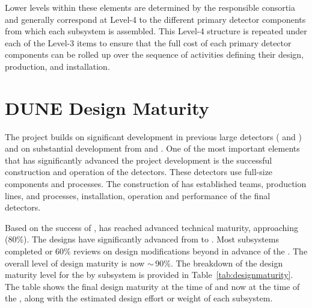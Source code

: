 Lower levels within these  elements are determined by 
the responsible consortia and generally correspond at Level-4 to 
the different primary detector components from which each subsystem
is assembled.  This Level-4 structure is repeated under each of the 
Level-3 items to ensure that the full cost of each primary detector 
components can be rolled up over the sequence of activities defining 
their design, production, and installation.       

\section{DUNE Design Maturity}

The  project builds on significant development in previous
large  detectors ( and ) and on
substantial development from  and . One of the most important
elements that has significantly advanced the project development is
the successful construction and operation of the 
detectors. These detectors use full-size  components and
processes. The construction of  has established
teams, production lines,  and  processes, installation, operation
and performance of the final  detectors. 

Based on the
success of ,  has reached advanced technical
maturity, approaching (80\%). The designs have significantly advanced
from  to . Most subsystems completed
 or 60\% reviews on design modifications beyond
 in advance of the . The overall level of
design maturity is now $\sim\,$90\%. The breakdown of the design maturity
level for the  by subsystem is provided in
Table~\ref{tab:designmaturity}. The table shows the final 
design maturity at the time of  and now at the time
of the , along with the estimated design effort or weight
of each subsystem. 


